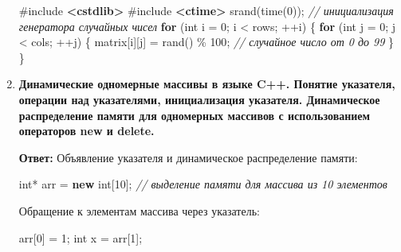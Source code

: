 \documentclass[
]{article}
\newenvironment{Shaded}{}{}
\newcommand{\CommentTok}[1]{\textcolor[rgb]{0.38,0.63,0.69}{\textit{#1}}}
\newcommand{\ControlFlowTok}[1]{\textcolor[rgb]{0.00,0.44,0.13}{\textbf{#1}}}
\newcommand{\DataTypeTok}[1]{\textcolor[rgb]{0.56,0.13,0.00}{#1}}
\newcommand{\DecValTok}[1]{\textcolor[rgb]{0.25,0.63,0.44}{#1}}
\newcommand{\ImportTok}[1]{\textcolor[rgb]{0.00,0.50,0.00}{\textbf{#1}}}
\newcommand{\KeywordTok}[1]{\textcolor[rgb]{0.00,0.44,0.13}{\textbf{#1}}}
\newcommand{\NormalTok}[1]{#1}
\newcommand{\OperatorTok}[1]{\textcolor[rgb]{0.40,0.40,0.40}{#1}}
\newcommand{\PreprocessorTok}[1]{\textcolor[rgb]{0.74,0.48,0.00}{#1}}
\begin{document}
\begin{enumerate}
\begin{Shaded}
\begin{Highlighting}[]
\PreprocessorTok{\#include }\ImportTok{\textless{}cstdlib\textgreater{}}
\PreprocessorTok{\#include }\ImportTok{\textless{}ctime\textgreater{}}
\NormalTok{srand}\OperatorTok{(}\NormalTok{time}\OperatorTok{(}\DecValTok{0}\OperatorTok{));} \CommentTok{// инициализация генератора случайных чисел}
\ControlFlowTok{for} \OperatorTok{(}\DataTypeTok{int}\NormalTok{ i }\OperatorTok{=} \DecValTok{0}\OperatorTok{;}\NormalTok{ i }\OperatorTok{\textless{}}\NormalTok{ rows}\OperatorTok{;} \OperatorTok{++}\NormalTok{i}\OperatorTok{)} \OperatorTok{\{}
    \ControlFlowTok{for} \OperatorTok{(}\DataTypeTok{int}\NormalTok{ j }\OperatorTok{=} \DecValTok{0}\OperatorTok{;}\NormalTok{ j }\OperatorTok{\textless{}}\NormalTok{ cols}\OperatorTok{;} \OperatorTok{++}\NormalTok{j}\OperatorTok{)} \OperatorTok{\{}
\NormalTok{        matrix}\OperatorTok{[}\NormalTok{i}\OperatorTok{][}\NormalTok{j}\OperatorTok{]} \OperatorTok{=}\NormalTok{ rand}\OperatorTok{()} \OperatorTok{\%} \DecValTok{100}\OperatorTok{;} \CommentTok{// случайное число от 0 до 99}
    \OperatorTok{\}}
\OperatorTok{\}}
\end{Highlighting}
\end{Shaded}
\item
  \textbf{Динамические одномерные массивы в языке C++. Понятие
  указателя, операции над указателями, инициализация указателя.
  Динамическое распределение памяти для одномерных массивов с
  использованием операторов new и delete.}

  \textbf{Ответ:} Объявление указателя и динамическое распределение
  памяти:

\begin{Shaded}
\begin{Highlighting}[]
\DataTypeTok{int}\OperatorTok{*}\NormalTok{ arr }\OperatorTok{=} \KeywordTok{new} \DataTypeTok{int}\OperatorTok{[}\DecValTok{10}\OperatorTok{];} \CommentTok{// выделение памяти для массива из 10 элементов}
\end{Highlighting}
\end{Shaded}

  Обращение к элементам массива через указатель:

\begin{Shaded}
\begin{Highlighting}[]
\NormalTok{arr}\OperatorTok{[}\DecValTok{0}\OperatorTok{]} \OperatorTok{=} \DecValTok{1}\OperatorTok{;}
\DataTypeTok{int}\NormalTok{ x }\OperatorTok{=}\NormalTok{ arr}\OperatorTok{[}\DecValTok{1}\OperatorTok{];}
\end{Highlighting}
\end{Shaded}


\end{enumerate}
\end{document}

